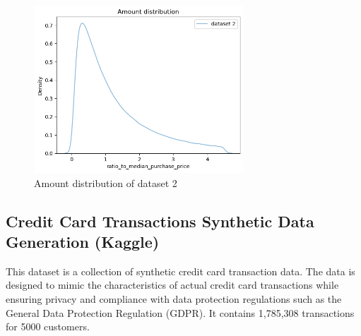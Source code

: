 \documentclass[12pt,a4paper, hidelinks]{article}
\begin{document}
\begin{figure}[h!]
    \centering
    \includegraphics[width=0.7\textwidth]{images/amount2.png}
    \caption{Amount distribution of dataset 2}
    \label{fig:amount2}
\end{figure}

\subsection{Credit Card Transactions Synthetic Data Generation (Kaggle)}

This dataset is a collection of synthetic credit card transaction data. The data is designed to mimic the characteristics of actual credit card transactions while ensuring privacy and compliance with data protection regulations such as the General Data Protection Regulation (GDPR). It contains 1,785,308 transactions for 5000 customers.
\end{document}
